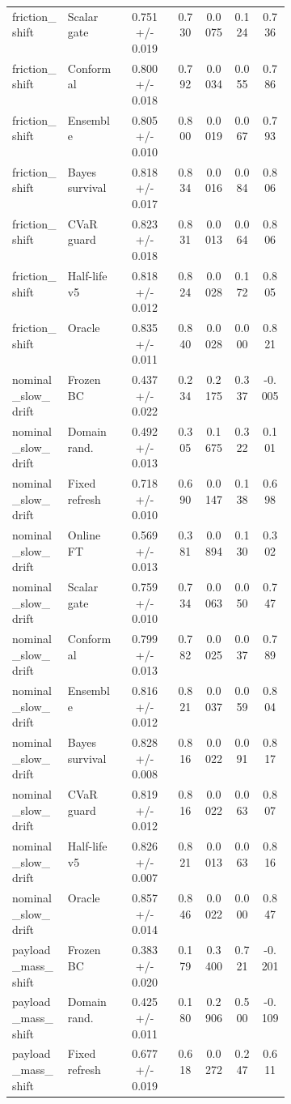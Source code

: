 \documentclass{article}
\begin{document}
\begin{center}
\begin{longtable}{p{0.20\linewidth}p{0.20\linewidth}ccccc}
friction\_shift & Scalar gate & 0.751 +/- 0.019 & 0.730 & 0.0075 & 0.124 & 0.736\\
friction\_shift & Conformal & 0.800 +/- 0.018 & 0.792 & 0.0034 & 0.055 & 0.786\\
friction\_shift & Ensemble & 0.805 +/- 0.010 & 0.800 & 0.0019 & 0.067 & 0.793\\
friction\_shift & Bayes survival & 0.818 +/- 0.017 & 0.834 & 0.0016 & 0.084 & 0.806\\
friction\_shift & CVaR guard & 0.823 +/- 0.018 & 0.831 & 0.0013 & 0.064 & 0.806\\
friction\_shift & Half-life v5 & 0.818 +/- 0.012 & 0.824 & 0.0028 & 0.172 & 0.805\\
friction\_shift & Oracle & 0.835 +/- 0.011 & 0.840 & 0.0028 & 0.000 & 0.821\\
nominal\_slow\_drift & Frozen BC & 0.437 +/- 0.022 & 0.234 & 0.2175 & 0.337 & -0.005\\
nominal\_slow\_drift & Domain rand. & 0.492 +/- 0.013 & 0.305 & 0.1675 & 0.322 & 0.101\\
nominal\_slow\_drift & Fixed refresh & 0.718 +/- 0.010 & 0.690 & 0.0147 & 0.138 & 0.698\\
nominal\_slow\_drift & Online FT & 0.569 +/- 0.013 & 0.381 & 0.0894 & 0.130 & 0.302\\
nominal\_slow\_drift & Scalar gate & 0.759 +/- 0.010 & 0.734 & 0.0063 & 0.050 & 0.747\\
nominal\_slow\_drift & Conformal & 0.799 +/- 0.013 & 0.782 & 0.0025 & 0.037 & 0.789\\
nominal\_slow\_drift & Ensemble & 0.816 +/- 0.012 & 0.821 & 0.0037 & 0.059 & 0.804\\
nominal\_slow\_drift & Bayes survival & 0.828 +/- 0.008 & 0.816 & 0.0022 & 0.091 & 0.817\\
nominal\_slow\_drift & CVaR guard & 0.819 +/- 0.012 & 0.816 & 0.0022 & 0.063 & 0.807\\
nominal\_slow\_drift & Half-life v5 & 0.826 +/- 0.007 & 0.821 & 0.0013 & 0.063 & 0.816\\
nominal\_slow\_drift & Oracle & 0.857 +/- 0.014 & 0.846 & 0.0022 & 0.000 & 0.847\\
payload\_mass\_shift & Frozen BC & 0.383 +/- 0.020 & 0.179 & 0.3400 & 0.721 & -0.201\\
payload\_mass\_shift & Domain rand. & 0.425 +/- 0.011 & 0.180 & 0.2906 & 0.500 & -0.109\\
payload\_mass\_shift & Fixed refresh & 0.677 +/- 0.019 & 0.618 & 0.0272 & 0.247 & 0.611\\

\end{longtable}
\end{center}
\end{document}
